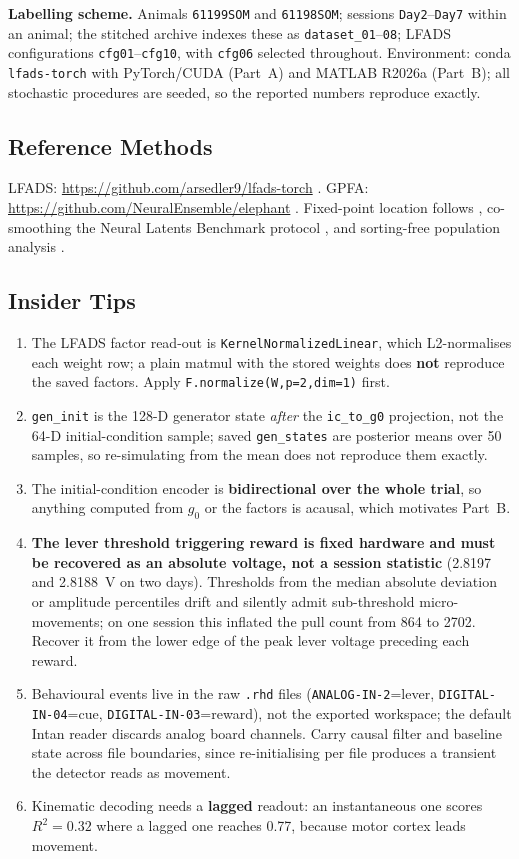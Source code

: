 \documentclass[10pt,twocolumn]{article}
\begin{document}
\textbf{Labelling scheme.} Animals \texttt{61199SOM} and \texttt{61198SOM};
sessions \texttt{Day2}--\texttt{Day7} within an animal; the stitched archive
indexes these as \texttt{dataset\_01}--\texttt{08}; LFADS configurations
\texttt{cfg01}--\texttt{cfg10}, with \texttt{cfg06} selected throughout.
Environment: conda \texttt{lfads-torch} with PyTorch/CUDA (Part~A) and MATLAB
R2026a (Part~B); all stochastic procedures are seeded, so the reported numbers
reproduce exactly.

\subsection{Reference Methods}

LFADS: \url{https://github.com/arsedler9/lfads-torch} \cite{sedler2023}. GPFA:
\url{https://github.com/NeuralEnsemble/elephant} \cite{yu2009}. Fixed-point
location follows \cite{sussillo2013}, co-smoothing the Neural Latents Benchmark
protocol \cite{pei2021}, and sorting-free population analysis
\cite{trautmann2019}.

\subsection{Insider Tips}

\begin{enumerate}
\item The LFADS factor read-out is \texttt{KernelNormalizedLinear}, which
L2-normalises each weight row; a plain matmul with the stored weights does
\textbf{not} reproduce the saved factors. Apply
\texttt{F.normalize(W,p=2,dim=1)} first.
\item \texttt{gen\_init} is the 128-D generator state \emph{after} the
\texttt{ic\_to\_g0} projection, not the 64-D initial-condition sample; saved
\texttt{gen\_states} are posterior means over 50 samples, so re-simulating from
the mean does not reproduce them exactly.
\item The initial-condition encoder is \textbf{bidirectional over the whole
trial}, so anything computed from $g_0$ or the factors is acausal, which motivates Part~B.
\item \textbf{The lever threshold triggering reward is fixed hardware and must be
recovered as an absolute voltage, not a session statistic} (2.8197 and 2.8188~V
on two days). Thresholds from the median absolute deviation or amplitude
percentiles drift and silently admit sub-threshold micro-movements; on one
session this inflated the pull count from 864 to 2702. Recover it from the lower
edge of the peak lever voltage preceding each reward.
\item Behavioural events live in the raw \texttt{.rhd} files
(\texttt{ANALOG-IN-2}=lever, \texttt{DIGITAL-IN-04}=cue,
\texttt{DIGITAL-IN-03}=reward), not the exported workspace; the default Intan
reader discards analog board channels. Carry causal filter and baseline state
across file boundaries, since re-initialising per file produces a transient the
detector reads as movement.
\item Kinematic decoding needs a \textbf{lagged} readout: an instantaneous one
scores $R^2=0.32$ where a lagged one reaches 0.77, because motor cortex leads
movement.
\end{enumerate}
\end{document}
